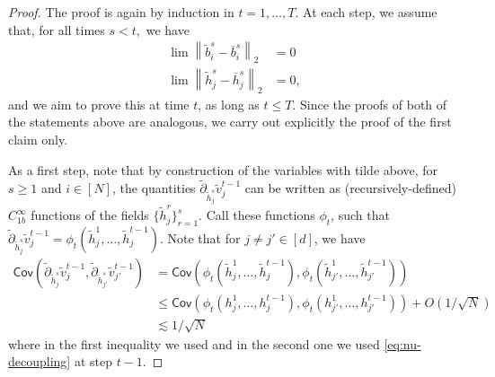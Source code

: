 \documentclass{article}
\newcommand{\1}{\mathbbm{1}}
\newcommand{\norm}[1]{\left\lVert#1\right\rVert}
\theoremstyle{plain}
\theoremstyle{definition}
\theoremstyle{remark}
\newcommand{\Cov}{\mathsf{Cov}}
\begin{document}
\begin{proof} The proof is again by induction in $t=1,\dots,T.$ At each step, we assume that, for all times $s< t,$ we have
    \begin{align*}
        \lim \norm{ \tilde{b}_i^s - \overline{b}_i^s } _2&= 0 \\
        \lim \norm{\tilde{h}_j^s - \overline{h}_j^s}_2 &= 0,
    \end{align*}
and we aim to prove this at time $t$, as long as $t\leq T.$ Since the proofs of both of the statements above are analogous, we carry out explicitly the proof of the first claim only.

As a first step, note that by construction of the variables with tilde above, for $s\geq 1$ and $i \in [N]$, the quantities $\tilde{\partial}_{\tilde{h}_j^s} \tilde{v}_j^{t-1}$
    can be written as (recursively-defined) $C^\infty_{1b}$ functions of the fields $\{\tilde{h}_j^r\}_{r=1}^{s}.$ Call these functions $\phi_t$, such that $\tilde{\partial}_{\tilde{h}_j^s} \tilde{v}_j^{t-1} = \phi_t(\tilde{h}_j^1,\dots,\tilde{h}_j^{t-1}).$ Note that for $j\neq j' \in [d]$, we have
    \begin{align*}
        \Cov(\tilde{\partial}_{\tilde{h}_j^s} \tilde{v}_j^{t-1}, \tilde{\partial}_{\tilde{h}_{j'}^s} \tilde{v}_{j'}^{t-1}) &= \Cov(\phi_t(\tilde{h}_j^1,\dots,\tilde{h}_j^{t-1}), \phi_t(\tilde{h}_{j'}^1,\dots,\tilde{h}_{j'}^{t-1})) \\
        &\leq \Cov(\phi_t(h_j^1,\dots,h_j^{t-1}), \phi_t(h_{j'}^1,\dots,h_{j'}^{t-1})) + O(1/\sqrt{N}) \\
        &\lesssim 1/\sqrt{N}
    \end{align*}
    where in the first inequality we used  and in the second one we used \eqref{eq:nu-decoupling} at step $t-1$.


\end{proof}
\end{document}
